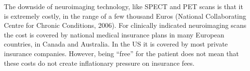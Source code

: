 The downside of neuroimaging technology, like \gls{SPECT} and \gls{PET} scans is that it is extremely costly, in the range of a few thousand Euros (National Collaborating Centre for Chronic Conditions, 2006). For clinically indicated neuroimaging scans the cost is covered by national medical insurance plans in many European countries, in Canada and Australia. In the US it is covered by most private insurance companies. However, being ``free'' for the patient does not mean that these costs do not create inflationary pressure on insurance fees. 
